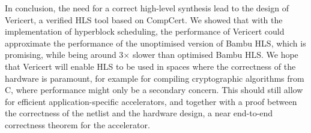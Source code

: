 In conclusion, the need for a correct high-level synthesis lead to the design of
Vericert, a verified \gls{HLS} tool based on CompCert.  We showed that with the
implementation of hyperblock scheduling, the performance of Vericert could
approximate the performance of the unoptimised version of Bambu HLS, which is
promising, while being around 3$\times$ slower than optimised Bambu HLS.  We
hope that Vericert will enable \gls{HLS} to be used in spaces where the
correctness of the hardware is paramount, for example for compiling
cryptographic algorithms from C, where performance might only be a secondary
concern.  This should still allow for efficient application-specific
accelerators, and together with a proof between the correctness of the netlist
and the hardware design, a near end-to-end correctness theorem for the
accelerator.

